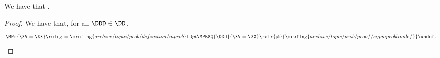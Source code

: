 \begin{proposition}
  We have that \mpproblimdefprop.%
\end{proposition}

\begin{proof}
  We have that, for all $\DDD \in \DD$,
    $$ \MPr{\XV = \XX} \relrg = {\mreflng{archive/topic/prob/definition/mprob}} 10pt
                    \MPRSQ{\DDD}{\XV = \XX}
                    \relr {\ne} {\mreflng{archive/topic/prob/proof/sqpmproblimdef}}
                    \undef.$$%
\end{proof}
